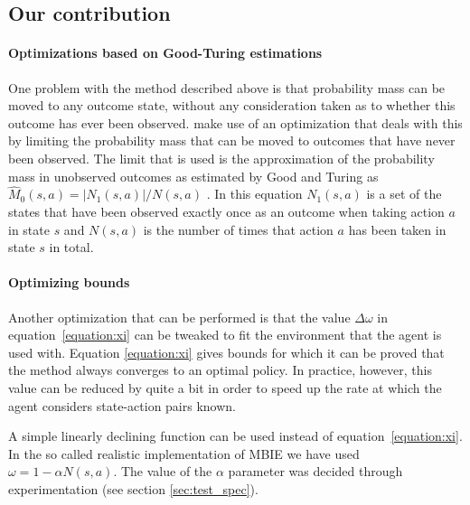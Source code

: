\subsection{Our contribution}

\paragraph{Optimizations based on Good-Turing estimations}

\label{sec:mbie_gt}

One problem with the method described above is that probability mass can be
moved to any outcome state, without any consideration taken as to whether this
outcome has ever been observed. \textcite{dietterich2013pac} make
use of an optimization that deals with this by limiting the probability mass
that can be moved to outcomes that have never been observed. The limit that is used is the approximation
of the probability mass in unobserved outcomes as estimated by Good and Turing
as $\hat{M}_0(s,a) = |N_1(s,a)| / N(s,a)$ \parencite{gtpaper}. In this
equation $N_1(s,a)$ is a set of the states that have been observed exactly
once as an outcome when taking action $a$ in state $s$ and $N(s,a)$ is the
number of times that action $a$ has been taken in state $s$ in total. 

\paragraph{Optimizing bounds} Another optimization that can be performed is that the value $\Delta \omega$ in
equation~\eqref{equation:xi} can be tweaked to fit the environment that the agent
is used with. Equation \eqref{equation:xi} gives bounds for which it can be
proved that the method always converges to an optimal policy. In practice,
however, this value can be reduced by quite a bit in order to speed up the rate
at which the agent considers state-action pairs known. 

A simple linearly declining function can be used instead of
equation~\eqref{equation:xi}. In the so called realistic implementation of MBIE we have
used $\omega = 1 - \alpha N(s,a).$ The value of the $\alpha$ parameter was decided through experimentation (see section \ref{sec:test_spec}).
